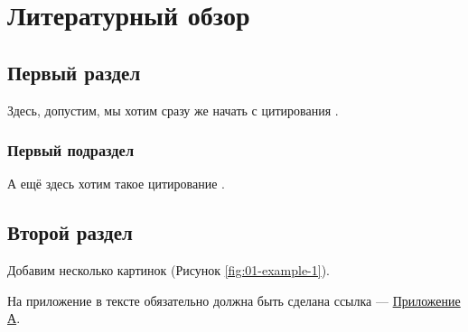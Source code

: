 \section{Литературный обзор}

\subsection{Первый раздел}
    Здесь, допустим, мы хотим сразу же начать с цитирования \cite{newton2014newton}. 
    
    \subsubsection{Первый подраздел}
        А ещё здесь хотим такое цитирование \cite{granqvist1976ultrafine, нагаев1992малые}. 

\subsection{Второй раздел}
    Добавим несколько картинок (Рисунок \ref{fig:01-example-1}). 
    
    
    На приложение в тексте обязательно должна быть сделана ссылка ---  \hyperlink{app-a}{Приложение А}.
    
        
\clearpage
